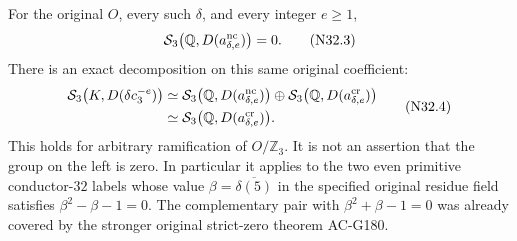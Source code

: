 \begin{theorem}
\label{AC-G193}
For the original $O$, every such $\delta$, and every integer $e\geq1$,
\[
       \mathcal S_3\bigl(\mathbb Q,D(a_{\delta,e}^{\rm nc})\bigr)=0.
 \tag{N32.3}
\]
There is an exact decomposition on this same original coefficient:
\[
 \begin{split}
 \mathcal S_3\bigl(K,D(\delta c_3^{-e})\bigr)
 &\simeq
 \mathcal S_3\bigl(\mathbb Q,D(a_{\delta,e}^{\rm nc})\bigr)
 \oplus
 \mathcal S_3\bigl(\mathbb Q,D(a_{\delta,e}^{\rm cr})\bigr)\\
 &\simeq
 \mathcal S_3\bigl(\mathbb Q,D(a_{\delta,e}^{\rm cr})\bigr).
 \end{split}\tag{N32.4}
\]
This holds for arbitrary ramification of $O/\mathbb Z_3$.
It is not an assertion that the group on the left is zero.
In particular it applies to the two even primitive conductor-$32$
labels whose value $\beta=\overline{\delta(5)}$ in the specified
original residue field satisfies $\beta^2-\beta-1=0$.
The complementary pair with $\beta^2+\beta-1=0$ was already covered
by the stronger original strict-zero theorem AC-G180.
\end{theorem}

